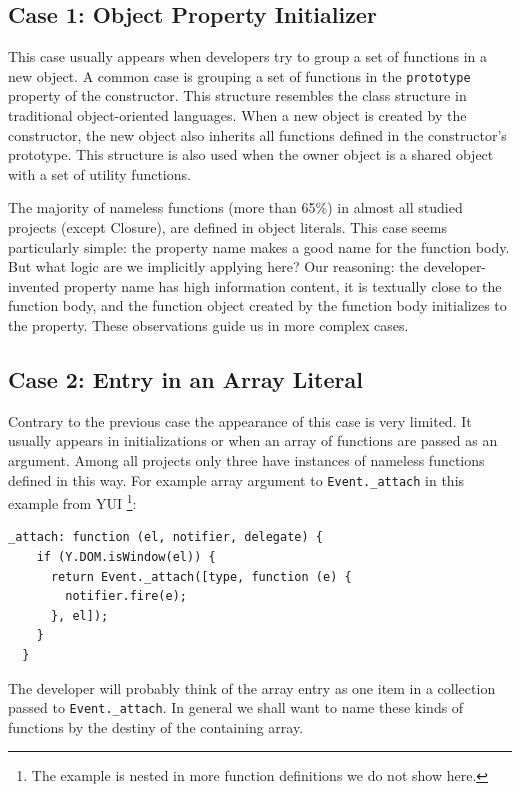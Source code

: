 \documentclass[10pt, preprint]{sigplanconf}
\begin{document}
\subsection{Case 1: Object Property Initializer}
 This case usually appears when developers try to group a set of functions in a new object. A common case is grouping a set of functions in the \verb|prototype| property of the constructor. This structure resembles the class structure in traditional object-oriented languages. When a new object is created by the constructor, the new object also inherits all functions defined in the constructor's prototype. This structure is also used  when the owner object is a shared object with a set of utility functions.
  
The majority of nameless functions (more than 65\%) in almost all studied projects (except Closure), are defined in object literals. This case seems particularly simple: the property name makes a good name for the function body. But what logic are we implicitly applying here? Our reasoning: the developer-invented property name has high information content, it is textually close to the function body, and the function object created by the function body initializes to the property. These observations guide us in more complex cases.
 
\subsection{Case 2: Entry in an Array Literal}
\label{sec:arrayLiteral}
Contrary to the previous case the appearance of this case is very limited. It usually appears in initializations or when an array of functions are passed as an argument. Among all projects only three have instances of nameless functions defined in this way. For example array argument to \verb|Event._attach| in this example from YUI \footnote[3]{The example is nested in more function definitions we do not show here.}:
\lstset{basicstyle=\scriptsize}
\begin{lstlisting}[frame=single, language=myLang]
  _attach: function (el, notifier, delegate) {
    if (Y.DOM.isWindow(el)) {
      return Event._attach([type, function (e) {
        notifier.fire(e);
      }, el]);
    }
  }
\end{lstlisting}
The developer will probably think of the array entry as one item in a collection passed to \verb|Event._attach|. In general we shall want to name these kinds of functions by the destiny of the containing array.
\end{document}
